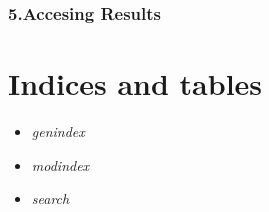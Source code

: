 \documentclass[letterpaper,10pt,english]{sphinxmanual}
\begin{document}
\subsection{5.Accesing Results}
\label{wireless_example:accesing-results}

\chapter{Indices and tables}
\label{index:indices-and-tables}\begin{itemize}
\item {} 
\emph{genindex}

\item {} 
\emph{modindex}

\item {} 
\emph{search}

\end{itemize}



\renewcommand{\indexname}{Index}
\printindex
\end{document}
